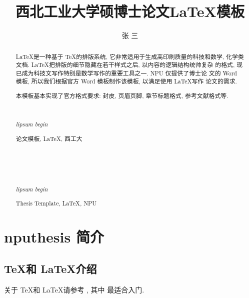 \documentclass[twoside, workbib, UTF8, phd, workbib=biblatex]{nputhesis}
\title[\LaTeX\ Template for Thesis of NPU]{西北工业大学硕博士论文\LaTeX 模板}
\author[San Zhang]{张\,\,三}
\theoremstyle{plain}
\begin{document}
\makecover    %
\frontmatter  %

\begin{abstract}
  \LaTeX 是一种基于 \TeX 的排版系统, 它非常适用于生成高印刷质量的科技和数学,
  化学类文档. \LaTeX 把排版的细节隐藏在若干样式之后, 以内容的逻辑结构统帅复杂
  的格式, 现已成为科技文写作特别是数学写作的重要工具之一. NPU 仅提供了博士论
  文的 Word 模板, 所以我们根据官方 Word 模板制作该模板, 以满足使用 \LaTeX 写作
  论文的需求.

  本模板基本实现了官方格式要求: 封皮, 页眉页脚, 章节标题格式, 参考文献格式等.

  { %
    \noindent\hrulefill\\
    {\centerline {\it lipsum begin}}
    \noindent\hrulefill
  }
  \begin{keywords}
    论文模板, \LaTeX, 西工大
  \end{keywords}
\end{abstract}

\begin{Abstract}
  { %
    \noindent\hrulefill\\
    {\centerline {\it lipsum begin}}
    \noindent\hrulefill
  }
  \begin{Keywords}
    Thesis Template, \LaTeX, NPU
  \end{Keywords}
\end{Abstract}

\tableofcontents    %
\printnomenclature  %
\mainmatter         %


\chapter{nputhesis 简介}

\section{\TeX 和 \LaTeX 介绍}
关于 \TeX 和 \LaTeX 请参考 \cite{Knuth1986,Lamport1994,Liu2013}, 其中 \cite{Liu2013} 最适合入门.
\end{document}
